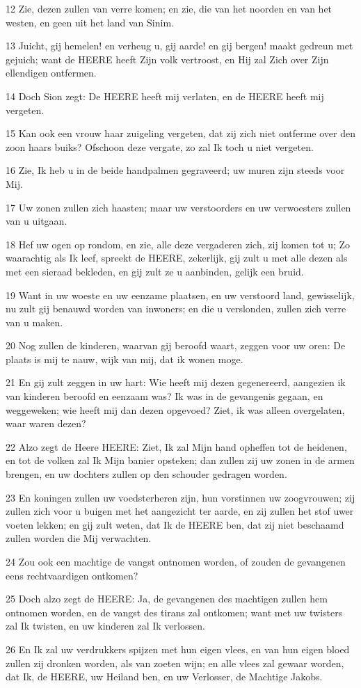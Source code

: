 \par 12 Zie, dezen zullen van verre komen; en zie, die van het noorden en van het westen, en geen uit het land van Sinim.
\par 13 Juicht, gij hemelen! en verheug u, gij aarde! en gij bergen! maakt gedreun met gejuich; want de HEERE heeft Zijn volk vertroost, en Hij zal Zich over Zijn ellendigen ontfermen.
\par 14 Doch Sion zegt: De HEERE heeft mij verlaten, en de HEERE heeft mij vergeten.
\par 15 Kan ook een vrouw haar zuigeling vergeten, dat zij zich niet ontferme over den zoon haars buiks? Ofschoon deze vergate, zo zal Ik toch u niet vergeten.
\par 16 Zie, Ik heb u in de beide handpalmen gegraveerd; uw muren zijn steeds voor Mij.
\par 17 Uw zonen zullen zich haasten; maar uw verstoorders en uw verwoesters zullen van u uitgaan.
\par 18 Hef uw ogen op rondom, en zie, alle deze vergaderen zich, zij komen tot u; Zo waarachtig als Ik leef, spreekt de HEERE, zekerlijk, gij zult u met alle dezen als met een sieraad bekleden, en gij zult ze u aanbinden, gelijk een bruid.
\par 19 Want in uw woeste en uw eenzame plaatsen, en uw verstoord land, gewisselijk, nu zult gij benauwd worden van inwoners; en die u verslonden, zullen zich verre van u maken.
\par 20 Nog zullen de kinderen, waarvan gij beroofd waart, zeggen voor uw oren: De plaats is mij te nauw, wijk van mij, dat ik wonen moge.
\par 21 En gij zult zeggen in uw hart: Wie heeft mij dezen gegenereerd, aangezien ik van kinderen beroofd en eenzaam was? Ik was in de gevangenis gegaan, en weggeweken; wie heeft mij dan dezen opgevoed? Ziet, ik was alleen overgelaten, waar waren dezen?
\par 22 Alzo zegt de Heere HEERE: Ziet, Ik zal Mijn hand opheffen tot de heidenen, en tot de volken zal Ik Mijn banier opsteken; dan zullen zij uw zonen in de armen brengen, en uw dochters zullen op den schouder gedragen worden.
\par 23 En koningen zullen uw voedsterheren zijn, hun vorstinnen uw zoogvrouwen; zij zullen zich voor u buigen met het aangezicht ter aarde, en zij zullen het stof uwer voeten lekken; en gij zult weten, dat Ik de HEERE ben, dat zij niet beschaamd zullen worden die Mij verwachten.
\par 24 Zou ook een machtige de vangst ontnomen worden, of zouden de gevangenen eens rechtvaardigen ontkomen?
\par 25 Doch alzo zegt de HEERE: Ja, de gevangenen des machtigen zullen hem ontnomen worden, en de vangst des tirans zal ontkomen; want met uw twisters zal Ik twisten, en uw kinderen zal Ik verlossen.
\par 26 En Ik zal uw verdrukkers spijzen met hun eigen vlees, en van hun eigen bloed zullen zij dronken worden, als van zoeten wijn; en alle vlees zal gewaar worden, dat Ik, de HEERE, uw Heiland ben, en uw Verlosser, de Machtige Jakobs.

